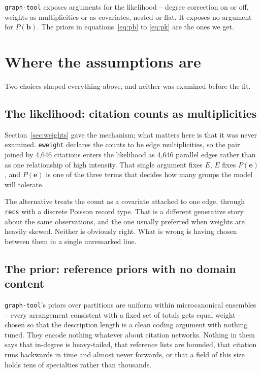 \documentclass[11pt]{article}
\newcommand{\code}[1]{\texttt{\small #1}}
\begin{document}
\code{graph-tool} exposes arguments for the likelihood -- degree correction on
or off, weights as multiplicities or as covariates, nested or flat. It exposes
no argument for $P(\bm{b})$. The priors in equations~\eqref{eq:pb} to
\eqref{eq:pk} are the ones we get.

\section{Where the assumptions are}

Two choices shaped everything above, and neither was examined before the fit.

\subsection{The likelihood: citation counts as multiplicities}

Section~\ref{sec:weights} gave the mechanism; what matters here is that it was
never examined. \code{eweight} declares the counts to be edge multiplicities,
so the pair joined by 4{,}646 citations enters the likelihood as 4{,}646
parallel edges rather than as one relationship of high intensity. That single
argument fixes $E$, $E$ fixes $P(\bm{e})$, and $P(\bm{e})$ is one of the three
terms that decides how many groups the model will tolerate.

The alternative treats the count as a covariate attached to one edge, through
\code{recs} with a discrete Poisson record type. That is a different generative
story about the same observations, and the one usually preferred when weights
are heavily skewed. Neither is obviously right. What is wrong is having
chosen between them in a single unremarked line.

\subsection{The prior: reference priors with no domain content}

\code{graph-tool}'s priors over partitions are uniform within microcanonical
ensembles -- every arrangement consistent with a fixed set of totals gets equal
weight -- chosen so that the description length is a clean coding argument with
nothing tuned. They encode nothing whatever about citation networks. Nothing in
them says that in-degree is heavy-tailed, that reference lists are bounded, that
citation runs backwards in time and almost never forwards, or that a field of
this size holds tens of specialties rather than thousands.
\end{document}
